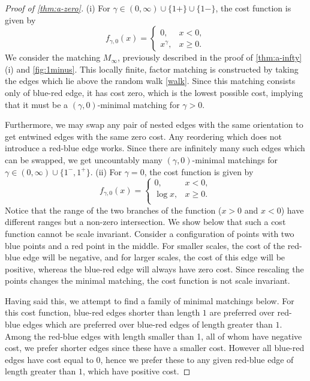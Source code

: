 \documentclass{article}
\begin{document}
\begin{proof}[Proof of \cref{thm:a-zero}]
  (i) For $\gamma\in(0,\infty)\cup\{1+\}\cup\{1-\}$, the cost function
  is given by
  \[
 f_{\gamma,0}(x) =
    \begin{cases}
      0, & x<0,\\
      x^\gamma, & x\geq 0. \end{cases}
      \]
We consider the matching $M_{\infty}$, previously described in the proof of
      \cref{thm:a-infty}(i) and \cref{fig:1minus}. This locally
      finite, factor matching is constructed by taking the
      edges which lie above the random walk \cref{walk}. Since this
      matching consists only of blue-red edge, it has
      cost zero, which is the lowest possible cost, implying that it must be a
      $(\gamma,0)$-minimal matching for $\gamma>0$.

      Furthermore, we may swap any
      pair of nested edges with the same orientation to get entwined
      edges with the same zero cost. Any reordering which does not
      introduce a red-blue edge works. Since there are infinitely many
      such edges which can be swapped, we get uncountably many
      $(\gamma,0)$-minimal
      matchings for $\gamma\in(0,\infty)\cup\{1^-,1^+\}$.
      (ii) For $\gamma=0$, the cost function is given by
       \[
 f_{\gamma,0}(x) =
    \begin{cases}
      0, & x<0,\\
      \log x, & x\geq 0.\\ \end{cases}
      \]
Notice that the range of the two branches of the function ($x>0$ and
      $x<0$) have different ranges but a non-zero intersection. We
      show below that such a cost function cannot be
      scale invariant. Consider a configuration of points with two
      blue points and a red point in the middle. For smaller scales,
      the cost of the red-blue edge will be negative, and for larger
      scales, the cost of this edge will be positive, whereas the
      blue-red edge will always have zero cost. Since rescaling the
      points changes the minimal matching, the cost function is not
      scale invariant.

      Having said this, we attempt to find a family of minimal matchings below.
      For this cost function, blue-red edges shorter than length $1$
      are preferred over red-blue edges which are preferred over
      blue-red edges of length greater than $1$. Among the red-blue
      edges with length smaller than 1, all of whom have negative
      cost, we prefer shorter edges since these have a smaller cost.
      However all blue-red edges have cost equal to $0$, hence we
      prefer these to any given red-blue edge of length greater than
      $1$, which have positive cost.


\end{proof}
\end{document}
